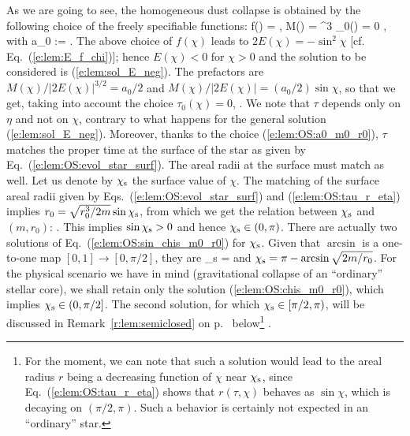 As we are going to see, the homogeneous dust collapse is obtained by the
following choice of the freely specifiable functions:
\be \label{e:lem:OS:free_func}
    f(\chi) = \cos\chi,\qquad
    M(\chi) =  \sin^3\chi
    \qand \tau_0(\chi) = 0 ,
\ee
with
\be \label{e:lem:OS:a0_m0_r0}
    a_0 :=  .
\ee
The above choice of $f(\chi)$ leads to $2 E(\chi) = -\sin^2\chi$
[cf. Eq.~(\ref{e:lem:E_f_chi})]; hence $E(\chi) < 0$ for $\chi>0$
and the solution to be considered is (\ref{e:lem:sol_E_neg}).
The prefactors are $M(\chi)/|2E(\chi)|^{3/2} = a_0/2$ and
$M(\chi)/|2E(\chi)| = (a_0/2) \sin\chi$, so that we get, taking into account
the choice $\tau_0(\chi) = 0$,
\be \label{e:lem:OS:tau_r_eta}
     \leq \eta \leq \pi .
\ee
We note that $\tau$ depends only on $\eta$ and not on $\chi$, contrary
to what happens for the general solution (\ref{e:lem:sol_E_neg}). Moreover, thanks to the choice
(\ref{e:lem:OS:a0_m0_r0}), $\tau$ matches the proper time at the surface
of the star as given by Eq.~(\ref{e:lem:OS:evol_star_surf}).
The areal radii at the surface must match as well. Let us denote by
$\chi_{\rm s}$ the surface value of $\chi$. The
matching of the surface areal radii given by Eqs.~(\ref{e:lem:OS:evol_star_surf})
and (\ref{e:lem:OS:tau_r_eta}) implies $r_0 = \sqrt{r_0^3/2m}\sin\chi_{\rm s}$,
from which we get the relation between $\chi_{\rm s}$ and
$(m, r_0)$:
\be \label{e:lem:OS:sin_chis_m0_r0}
    .
\ee
This implies $\sin\chi_{\rm s} > 0$ and hence $\chi_{\rm s} \in (0,\pi)$.
There are actually two solutions of Eq.~(\ref{e:lem:OS:sin_chis_m0_r0})
for $\chi_{\rm s}$.
Given that $\arcsin$ is a one-to-one map $[0,1] \to [0,\pi/2]$, they are
\be \label{e:lem:OS:chis_m0_r0}
    \chi_{\rm s} = \arcsin{}
\ee
and $\chi_{\rm s} = \pi - \arcsin\sqrt{2 m/r_0}$.
For the physical scenario we have in mind (gravitational collapse of an ``ordinary'' stellar core),
we shall retain only the solution (\ref{e:lem:OS:chis_m0_r0}), which implies $\chi_{\rm s} \in (0, \pi/2]$.
The second solution, for which $\chi_{\rm s} \in [\pi/2, \pi)$,    %
will be discussed in Remark~\ref{r:lem:semiclosed} on p.~\pageref{r:lem:semiclosed} below\footnote{For the moment, we can note that such a solution
would lead to the areal radius $r$ being a decreasing function of $\chi$ near $\chi_{\rm s}$,
since Eq.~(\ref{e:lem:OS:tau_r_eta}) shows that $r(\tau,\chi)$ behaves as $\sin\chi$, which is decaying
on $(\pi/2,\pi)$. Such a behavior is certainly not expected in an ``ordinary'' star.} .
